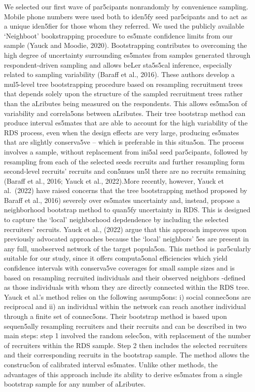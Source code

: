 \documentclass[
  12pt,
  letterpaper,
  DIV=11,
  numbers=noendperiod]{scrartcl}
\theoremstyle{plain}
\theoremstyle{definition}
\begin{document}
We selected our first wave of par5cipants nonrandomly by convenience
sampling. Mobile phone numbers were used both to iden5fy seed
par5cipants and to act as a unique iden5fier for those whom they
referred. We used the publicly available `Neighboot' bookstrapping
procedure to es5mate confidence limits from our sample (Yauck and
Moodie, 2020). Bootstrapping contributes to overcoming the high degree
of uncertainty surrounding es5mates from samples generated through
respondent-driven sampling and allows beLer sta5s5cal inference,
especially related to sampling variability (Baraﬀ et al., 2016). These
authors develop a mul5-level tree bootstrapping procedure based on
resampling recruitment trees that depends solely upon the structure of
the sampled recruitment trees rather than the aLributes being measured
on the respondents. This allows es5ma5on of variability and correla5ons
between aLributes. Their tree bootstrap method can produce interval
es5mates that are able to account for the high variability of the RDS
process, even when the design eﬀects are very large, producing es5mates
that are slightly conserva5ve -- which is preferable in this situa5on.
The process involves a sample, without replacement from ini5al seed
par5cipants, followed by resampling from each of the selected seeds
recruits and further resampling form second-level recruits' recruits and
con5nues un5l there are no recruits remaining (Baraﬀ et al., 2016; Yauck
et al., 2022).More recently, however, Yauck et al.~(2022) have raised
concerns that the tree bootstrapping method proposed by Baraﬀ et al.,
2016) severely over es5mates uncertainty and, instead, propose a
neighborhood bootstrap method to quan5fy uncertainty in RDS. This is
designed to capture the `local' neighborhood depdendence by including
the selected recruiters' recruits. Yauck et al., (2022) argue that this
approach improves upon previously advocated approaches because the
`local' neighbors' 5es are present in any full, unobserved network of
the target popula5on. This method is par5cularly suitable for our study,
since it oﬀers computa5onal eﬃciencies which yield confidence intervals
with conserva5ve coverages for small sample sizes and is based on
resampling recruited individuals and their observed neighbors -defined
as those individuals with whom they are directly connected within the
RDS tree. Yauck et al.'s method relies on the following assump5ons: i)
social connec5ons are reciprocal and ii) an individual within the
network can reach another individual through a finite set of connec5ons.
Their bootstrap method is based upon sequen5ally resampling recruiters
and their recruits and can be described in two main steps: step 1
involved the random selec5on, with replacement of the number of
recruiters within the RDS sample. Step 2 then includes the selected
recruiters and their corresponding recruits in the bootstrap sample. The
method allows the construc5on of calibrated interval es5mates. Unlike
other methods, the advantages of this approach include its ability to
derive es5mates from a single bootstrap sample for any number of
aLributes.
\end{document}
